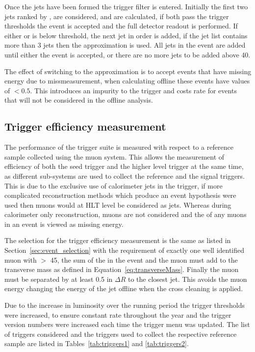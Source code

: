 Once the jets have been formed the trigger filter is entered. Initially the first two jets ranked by \ET, are considered, \HT and \alt are calculated, if both pass the trigger thresholds the event is accepted and the full detector readout is performed. If either \HT or \alt is below threshold, the next jet in \ET order is added, if the jet list contains more than 3 jets then the \bt approximation is used. All jets in the event are added until either the event is accepted, or there are no more jets to be added above \unit{40}{\GeV}.

The effect of switching to the \bt approximation is to accept events that have missing energy due to missmeasurement, when calculating \alt offline these events have values of \alt $< 0.5$. This introduces an impurity to the trigger and costs rate for events that will not be considered in the offline analysis.


\subsection{Trigger efficiency measurement} %
\label{sub:trigger_efficiency_measurement}

The performance of the \alt trigger suite is measured with respect to a 
reference sample collected using the muon system. This allows the measurement 
of efficiency of both the \Lone seed trigger and the higher level trigger at 
the same time, as different sub-systems are used to collect the reference and 
the signal triggers. This is due to the exclusive use of calorimeter jets in 
the \alt trigger, if more complicated reconstruction methods which produce an 
event hypothesis were used then muons would at HLT level be considered as 
jets. Whereas during calorimeter only reconstruction, muons are not considered 
and the \pt of any muons in an event is viewed as missing energy.

The selection for the trigger efficiency measurement is the same as listed in 
Section~\ref{sec:event_selection} with the requirement of exactly one well 
identified muon with \PT $>$ \unit{45}{\GeV}, the sum of the \MET in the event 
and the muon must add to the transverse \PW mass as defined in Equation~\eqref{eq:transverseMass}. Finally the muon must be separated by 
at least 0.5 in $\Delta R$ to the closest jet. This avoids the muon energy 
changing the energy of the jet offline when the cross cleaning is applied.

Due to the increase in luminosity over the running period the trigger 
thresholds were increased, to ensure constant rate throughout the year and the 
trigger version numbers were increased each time the trigger menu was updated.
The list of triggers considered and the triggers used to collect the respective 
reference sample are listed in Tables~\ref{tab:triggers1} and 
\ref{tab:triggers2}.

